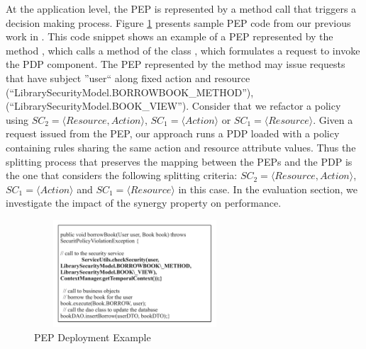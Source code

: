 At the application level, the PEP is represented by a method call that triggers a decision making process.
Figure \ref{PEPdeploymentexample} presents sample PEP code from our previous work in \cite{legacy}. This code snippet
 shows an example of a PEP 
represented by the method , which calls a method of the class , which formulates a request to invoke the PDP component. 
The PEP represented by the method  may issue requests that have subject ''user`` along fixed action 
and resource (``LibrarySecurityModel.BORROWBOOK\_METHOD''), (``LibrarySecurityModel.BOOK\_VIEW'').
Consider that we refactor a policy using $SC_{2}=\langle Resource,Action\rangle$, $SC_{1}=\langle Action\rangle$ or $SC_{1}=\langle Resource\rangle$.
Given a request issued from the PEP, our approach runs a PDP loaded with a policy containing rules sharing the same action and resource attribute values. 
Thus the splitting process that preserves the mapping between the PEPs and the PDP is the one that considers the following splitting criteria: 
$SC_{2}=\langle Resource,Action\rangle$, $SC_{1}=\langle Action\rangle$ and $SC_{1}=\langle Resource\rangle$ in this case.
In the evaluation section, we investigate the impact of the synergy property on performance.

\begin{figure}[!h]
\begin{center}
\includegraphics[width=7.5cm, height=4cm]{PEPExample}
\caption{PEP Deployment Example}
\label{PEPdeploymentexample}
\end{center}
\end{figure}